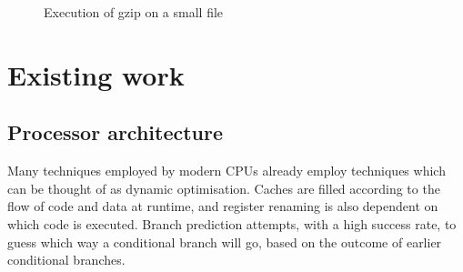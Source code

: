 \documentclass[11pt,letterpaper,onecolumn,notitlepage]{article}
\begin{document}
\begin{figure}[t]
\centerline{}
\caption{\label{gzipfreq}Execution of gzip on a small file}
\end{figure}

\section{Existing work}

\subsection{Processor architecture}

Many techniques employed by modern CPUs already employ techniques which can be thought of as dynamic optimisation. Caches are filled according to the flow of code and data at runtime, and register renaming is also dependent on which code is executed. Branch prediction attempts, with a high success rate, to guess which way a conditional branch will go, based on the outcome of earlier conditional branches.
\end{document}
